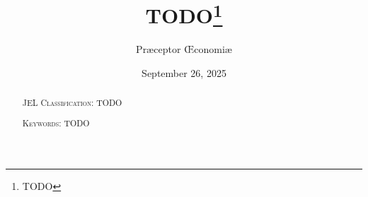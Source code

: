 \documentclass[english,a4paper,11pt]{article}
\title{TODO\thanks{TODO}}
\author[1,2]{Præceptor Œconomiæ}
\affil[1]{First University}
\affil[2]{Second University}
\date{September 26, 2025} %
\theoremstyle{definition}
\begin{document}
\frenchspacing
\maketitle

\begin{abstract}
    
    \par\vspace{1em}

    \noindent\textsc{JEL Classification}: TODO\par\vspace{1em}

    \noindent\textsc{Keywords}: TODO
\end{abstract}









\appendix


\end{document}

